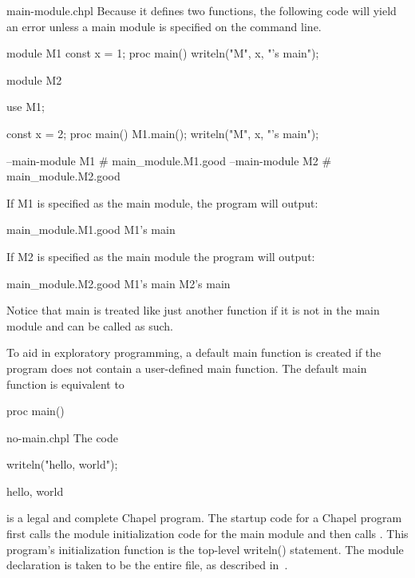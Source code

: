 \begin{chapelexample}{main-module.chpl}
Because it defines two  functions, the following code will yield an
error unless a main module is specified on the command line.
\begin{chapel}
module M1 {
  const x = 1;
  proc main() {
    writeln("M", x, "'s main");
  }
}
 
module M2 {
  use M1;

  const x = 2;
  proc main() {
    M1.main();
    writeln("M", x, "'s main");
  }
}
\end{chapel}
\begin{chapelcompopts}
--main-module M1 \# main\_module.M1.good
--main-module M2 \# main\_module.M2.good
\end{chapelcompopts}
If M1 is specified as the main module, the program will output:
\begin{chapelprintoutput}{main_module.M1.good}
M1's main
\end{chapelprintoutput}
If M2 is specified as the main module the program will output:
\begin{chapelprintoutput}{main_module.M2.good}
M1's main
M2's main
\end{chapelprintoutput}
Notice that main is treated like just another function if it is not in
the main module and can be called as such.
\end{chapelexample}



To aid in exploratory programming, a default main function is
created if the program does not contain a user-defined main function.  The
default main function is equivalent to
\begin{chapel}
proc main() {}
\end{chapel}

\begin{chapelexample}{no-main.chpl}
The code
\begin{chapel}
writeln("hello, world");
\end{chapel}
\begin{chapeloutput}
hello, world
\end{chapeloutput}
is a legal and complete Chapel program.  The startup code for a Chapel program
first calls the module initialization code for the main module and then
calls .  This program's initialization function is the top-level
writeln() statement.  The module declaration is taken to be the entire file,
as described in~.
\end{chapelexample}


